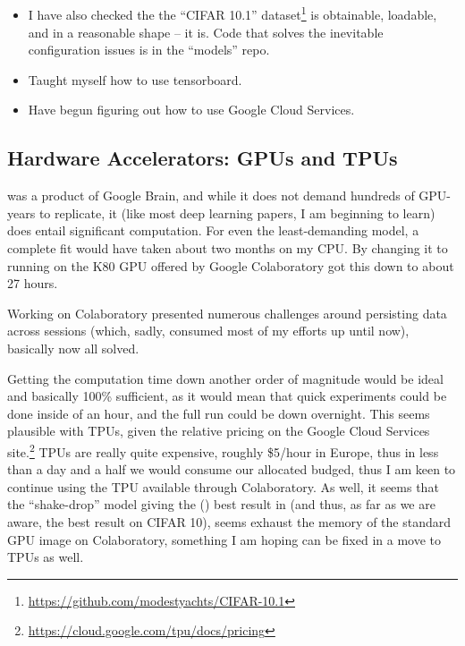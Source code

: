 \documentclass[10pt,twocolumn,letterpaper]{article}
\begin{document}
	\subsection{}
		\begin{itemize}
		\item 
			I have also checked the the ``CIFAR 10.1'' dataset\footnote{\url{https://github.com/modestyachts/CIFAR-10.1}} is obtainable, loadable, and in a reasonable shape -- it is. Code that solves the inevitable configuration issues is in the ``models'' repo.
		\item 
			Taught myself how to use tensorboard.
		\item 
			Have begun figuring out how to use Google Cloud Services. 
		\end{itemize}


\subsection{Hardware Accelerators: GPUs and TPUs}
	\cite{Cubuk2018} was a product of Google Brain, and while it does not demand hundreds of GPU-years to replicate, it (like most deep learning papers, I am beginning to learn) does entail significant computation. For even the least-demanding model, a complete fit would have taken about two months on my CPU. By changing it to running on the K80 GPU offered by Google Colaboratory got this down to about 27 hours. 
	
	Working on Colaboratory presented numerous challenges around persisting data across sessions (which, sadly, consumed most of my efforts up until now), basically now all solved. 
	
	Getting the computation time down another order of magnitude would be ideal and basically 100\% sufficient, as it would mean that quick experiments could be done inside of an hour, and the full run could be down overnight. This seems plausible with TPUs, given the relative pricing on the Google Cloud Services site.\footnote{\url{https://cloud.google.com/tpu/docs/pricing}} TPUs are really quite expensive, roughly \$5/hour in Europe, thus in less than a day and a half we would consume our allocated budged, thus I am keen to continue using the TPU available through Colaboratory. As well, it seems that the ``shake-drop'' model giving the (\cite{Yamada2018}) best result in \cite{Cubuk2018} (and thus, as far as we are aware, the best result on CIFAR 10), seems exhaust the memory of the standard GPU image on Colaboratory, something I am hoping can be fixed in a move to TPUs as well. 
	
\end{document}
